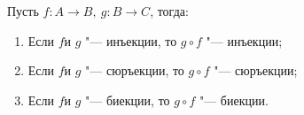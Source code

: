 
    Пусть $f\colon A\to B,\ g\colon B\to C$, тогда:
    \begin{enumerate}
        \item Если $f$и $g$ "--- инъекции, то $g\circ f$ "--- инъекции;

        \item Если $f$и $g$ "--- сюръекции, то $g\circ f$ "--- сюръекции;

        \item Если $f$и $g$ "--- биекции, то $g\circ f$ "--- биекции.
    \end{enumerate}
